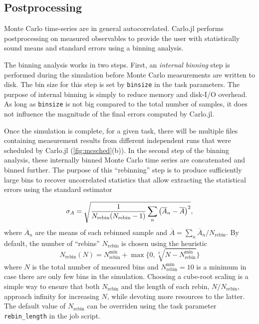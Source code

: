 \documentclass{SciPost}
\begin{document}
\subsection{Postprocessing}
\label{sec:postproc}
Monte Carlo time-series are in general autocorrelated. Carlo.jl performs postprocessing on measured observables to provide the user with statistically sound means and standard errors using a binning analysis.

The binning analysis works in two steps. First, an \textit{internal binning} step is performed during the simulation before Monte Carlo measurements are written to disk. The bin size for this step is set by \texttt{binsize} in the task parameters. The purpose of internal binning is simply to reduce memory and disk-I/O overhead. As long as \texttt{binsize} is not big compared to the total number of samples, it does not influence the magnitude of the final errors computed by Carlo.jl.

Once the simulation is complete, for a given task, there will be multiple files containing measurement results from different independent runs that were scheduled by Carlo.jl (\cref{fig:mcsched}(b)). In the second step of the binning analysis, these internally binned Monte Carlo time series are concatenated and binned further. The purpose of this ``rebinning'' step is to produce sufficiently large bins to recover uncorrelated statistics that allow extracting the statistical errors using the standard estimator

\begin{equation}
\sigma_A = \sqrt{\frac{1}{N_\text{rebin}(N_\text{rebin}-1)} \sum_n \qty(\overline{A}_n-\overline{A})^2},
\end{equation}
where $\overline{A}_n$ are the means of each rebinned sample and $\overline{A} = \sum_n \overline{A}_n / N_\text{rebin}$.
By default, the number of “rebins” $N_\text{rebin}$ is chosen using the heuristic
\begin{equation}
N_\text{rebin}(N) = N_\text{rebin}^\text{min} + \max\{0, \sqrt[3]{N-N_\text{rebin}^\text{min}}\}
\end{equation}
where $N$ is the total number of measured bins and $N_\text{rebin}^\text{min}=10$ is a minimum in case there are only few bins in the simulation. Choosing a cube-root scaling is a simple way to ensure that both $N_\text{rebin}$ and the length of each rebin, $N/N_\text{rebin}$, approach infinity for increasing $N$, while devoting more resources to the latter. The default value of $N_\text{rebin}$ can be overriden using the task parameter \texttt{rebin\_{}length} in the job script.
\end{document}

